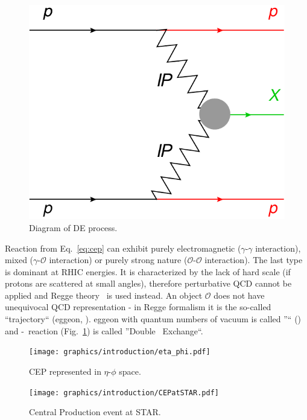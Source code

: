 \begin{figure}\vspace*{-19pt}
  \centering
  \includegraphics[width=0.92\linewidth]{graphics/introduction/DPE.pdf}\vspace{6pt}%
  \caption{Diagram of D\Pom E process.\\}%
  \label{fig:DPE}\vspace*{-9pt}%
\end{figure}

Reaction from Eq.~\eqref{eq:cep} can exhibit purely electromagnetic ($\gamma$-$\gamma$ interaction), mixed ($\gamma$-$\mathcal{O}$ interaction) or purely strong nature ($\mathcal{O}$-$\mathcal{O}$ interaction). The last type is dominant at RHIC energies. It is characterized by the lack of hard scale (if protons are scattered at small angles), therefore perturbative QCD cannot be applied and Regge theory~\cite{IntroductionToRegge} is used instead. An object $\mathcal{O}$ does not have unequivocal QCD representation - in Regge formalism it is the so-called ``trajectory`` (\Reg eggeon, \Reg). \Reg eggeon with quantum numbers of vacuum is called ''\Pomeron`` (\Pom) and \Pom-\Pom\ reaction (Fig.~\ref{fig:DPE}) is called ''Double \Pomeron\  Exchange``. %

\begin{figure}[b!]
\centering
\parbox{0.475\textwidth}{\vspace{-12pt}%
  \centering%
  \hspace*{-18pt}\texttt{[image: graphics/introduction/eta\_phi.pdf]}\vspace*{-15pt}%
  \caption{CEP represented in $\eta$-$\phi$ space.\\}%
  \label{fig:eta_phi}%
}
\quad\quad
\parbox{0.475\textwidth}{%
  \centering%
  \texttt{[image: graphics/introduction/CEPatSTAR.pdf]}%
  \caption{Central Production event at STAR.\\}\label{fig:CEPatSTAR}%
}%
\end{figure}

